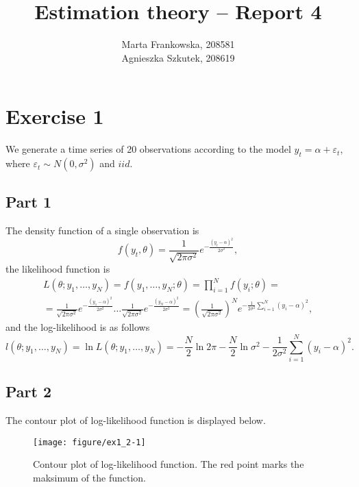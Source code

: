 \documentclass[12pt, a4paper]{article}\usepackage[]{graphicx}\usepackage[]{color}
\makeatletter
\def\maxwidth{ %
  \ifdim\Gin@nat@width>\linewidth
    \linewidth
  \else
    \Gin@nat@width
  \fi
}
\newenvironment{knitrout}{}{} %
\makeatother
\begin{document}
\title{Estimation theory -- Report 4}
\author{Marta Frankowska, 208581 \\ Agnieszka Szkutek, 208619}
\maketitle
\tableofcontents 



\section{Exercise 1}
We generate a time series of 20 observations according to the model $y_t = \alpha + \varepsilon_t$, where $\varepsilon_t \sim N(0,\sigma^2)$ and $iid$.

\subsection{Part 1}
The density function of a single observation is 
\[ f(y_t,\theta) = \frac{1}{\sqrt{2\pi\sigma^2}} e^{-\frac{(y_t-\alpha)^2}{2\sigma^2}},  \]
the likelihood function is 
\begin{gather*} 
L(\theta; y_1,\dots,y_N) = f(y_1,\dots,y_N; \theta) = \prod_{i=1}^{N} f(y_i; \theta) = \\
= \frac{1}{\sqrt{2\pi\sigma^2}} e^{-\frac{(y_1-\alpha)^2}{2\sigma^2}} \dots  \frac{1}{\sqrt{2\pi\sigma^2}} e^{-\frac{(y_N-\alpha)^2}{2\sigma^2}}
=  \left(\frac{1}{\sqrt{2\pi\sigma^2}} \right)^N e^{-\frac{1}{2\sigma^2} \sum_{i=1}^N (y_i-\alpha)^2} ,
\end{gather*}
and the log-likelihood is as follows
\[ l(\theta; y_1,\dots,y_N) = \ln{L(\theta; y_1,\dots,y_N)} = -\frac{N}{2} \ln{2\pi} -\frac{N}{2} \ln{\sigma^2} -\frac{1}{2\sigma^2} \sum_{i=1}^N (y_i-\alpha)^2.\]


\subsection{Part 2}
The contour plot of log-likelihood function is displayed below.
\begin{knitrout}
\color{fgcolor}\begin{figure}[H]

{\centering \texttt{[image: figure/ex1\_2-1]} 

}

\caption[Contour plot of log-likelihood function]{Contour plot of log-likelihood function. The red point marks the maksimum of the function.}\label{fig:ex1.2}
\end{figure}


\end{knitrout}
\end{document}
